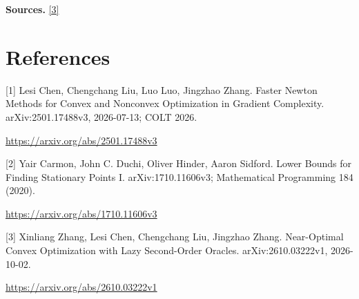 \documentclass[10pt,a4paper]{article}
\begin{document}
\textbf{Sources.} \href{https://arxiv.org/abs/2610.03222v1}{[3]}

\section{References}
[1] Lesi Chen, Chengchang Liu, Luo Luo, Jingzhao Zhang. Faster Newton Methods for Convex and Nonconvex Optimization in Gradient Complexity. arXiv:2501.17488v3, 2026-07-13; COLT 2026.

\url{https://arxiv.org/abs/2501.17488v3}

[2] Yair Carmon, John C. Duchi, Oliver Hinder, Aaron Sidford. Lower Bounds for Finding Stationary Points I. arXiv:1710.11606v3; Mathematical Programming 184 (2020).

\url{https://arxiv.org/abs/1710.11606v3}

[3] Xinliang Zhang, Lesi Chen, Chengchang Liu, Jingzhao Zhang. Near-Optimal Convex Optimization with Lazy Second-Order Oracles. arXiv:2610.03222v1, 2026-10-02.

\url{https://arxiv.org/abs/2610.03222v1}
\end{document}
